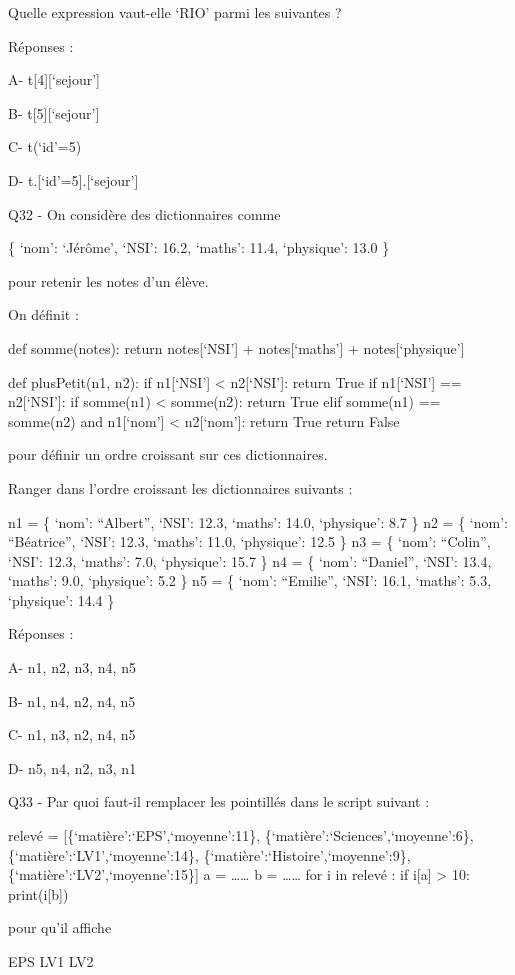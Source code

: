 \documentclass[
]{book}
\begin{document}
Quelle expression vaut-elle `RIO' parmi les suivantes ?

Réponses :

A- t{[}4{]}{[}`sejour'{]}

B- t{[}5{]}{[}`sejour'{]}

C- t(`id'=5)

D- t.{[}`id'=5{]}.{[}`sejour'{]}

Q32 - On considère des dictionnaires comme

\{ `nom': `Jérôme', `NSI': 16.2, `maths': 11.4, `physique': 13.0 \}

pour retenir les notes d'un élève.

On définit :

def somme(notes):
return notes{[}`NSI'{]} + notes{[}`maths'{]} + notes{[}`physique'{]}

def plusPetit(n1, n2):
if n1{[}`NSI'{]} \textless{} n2{[}`NSI'{]}:
return True
if n1{[}`NSI'{]} == n2{[}`NSI'{]}:
if somme(n1) \textless{} somme(n2):
return True
elif somme(n1) == somme(n2) and n1{[}`nom'{]} \textless{} n2{[}`nom'{]}:
return True
return False

pour définir un ordre croissant sur ces dictionnaires.

Ranger dans l'ordre croissant les dictionnaires suivants :

n1 = \{ `nom': ``Albert'', `NSI': 12.3, `maths': 14.0, `physique': 8.7 \}
n2 = \{ `nom': ``Béatrice'', `NSI': 12.3, `maths': 11.0, `physique': 12.5 \}
n3 = \{ `nom': ``Colin'', `NSI': 12.3, `maths': 7.0, `physique': 15.7 \}
n4 = \{ `nom': ``Daniel'', `NSI': 13.4, `maths': 9.0, `physique': 5.2 \}
n5 = \{ `nom': ``Emilie'', `NSI': 16.1, `maths': 5.3, `physique': 14.4 \}

Réponses :

A- n1, n2, n3, n4, n5

B- n1, n4, n2, n4, n5

C- n1, n3, n2, n4, n5

D- n5, n4, n2, n3, n1

Q33 - Par quoi faut-il remplacer les pointillés dans le script suivant :

relevé = {[}\{`matière':`EPS',`moyenne':11\}, \{`matière':`Sciences',`moyenne':6\}, \{`matière':`LV1',`moyenne':14\}, \{`matière':`Histoire',`moyenne':9\}, \{`matière':`LV2',`moyenne':15\}{]}
a = \ldots\ldots{}
b = \ldots\ldots{}
for i in relevé :
if i{[}a{]} \textgreater{} 10:
print(i{[}b{]})

pour qu'il affiche

EPS
LV1
LV2
\end{document}
